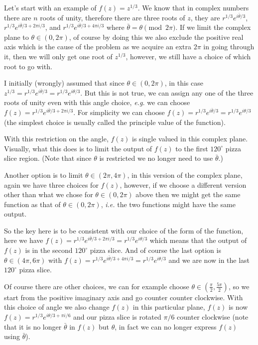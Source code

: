 \documentclass[aps,preprint,preprintnumbers,nofootinbib,showpacs,prd]{revtex4-1}
\newcommand{\ie}{{\it i.e.} }
\newcommand{\eg}{{\it e.g.} }
\begin{document}
Let's start with an example of $f(z) = z^{1/3}$. We know that in complex numbers there are $n$ roots of unity, therefore there are three roots of $z$, they are $r^{1/3} e^{i\bar\theta/3}$, $r^{1/3} e^{i\bar\theta/3 + 2\pi i/3}$, and $r^{1/3} e^{i\bar\theta/3 + 4\pi i/3}$ where $\bar\theta = \theta \pmod{2\pi}$. If we limit the complex plane to $\theta \in (0,2\pi)$, of course by doing this we also exclude the positive real axis which is the cause of the problem as we acquire an extra $2\pi$ in going through it, then we will only get one root of $z^{1/3}$, however, we still have a choice of which root to go with.

I initially (wrongly) assumed that since $\theta \in (0,2\pi)$, in this case $z^{1/3} = r^{1/3} e^{i\bar\theta/3} = r^{1/3} e^{i\theta/3}$. But this is not true, we can assign any one of the three roots of unity even with this angle choice, \eg we can choose $f(z) = r^{1/3} e^{i\bar\theta/3 + 2\pi i/3}$. For simplicity we can choose $f(z) = r^{1/3} e^{i\bar\theta/3} = r^{1/3} e^{i\theta/3}$ (the simplest choice is usually called the principle value of the function).

With this restriction on the angle, $f(z)$ is single valued in this complex plane. Visually, what this does is to limit the output of $f(z)$ to the first $120^\circ$ pizza slice region. (Note that since $\theta$ is restricted we no longer need to use $\bar\theta$.)

Another option is to limit $\theta \in (2\pi, 4\pi)$, in this version of the complex plane, again we have three choices for $f(z)$, however, if we choose a different version other than what we chose for $\theta \in (0,2\pi)$ above then we might get the same function as that of $\theta \in (0,2\pi)$, \ie the two functions might have the same output.

So the key here is to be consistent with our choice of the form of the function, here we have $f(z) = r^{1/3} e^{i\bar\theta/3 + 2\pi i/3} = r^{1/3} e^{i\theta/3}$ which means that the output of $f(z)$ is in the second $120^\circ$ pizza slice. And of course the last option is $\theta \in (4\pi, 6\pi)$ with $f(z) = r^{1/3} e^{i\bar\theta/3 + 4 \pi i/3}= r^{1/3} e^{i\theta/3}$ and we are now in the last $120^\circ$ pizza slice.

Of course there are other choices, we can for example choose $\theta \in (\tfrac{\pi}{2}, \tfrac{5\pi}{2})$, so we start from the positive imaginary axis and go counter counter clockwise. With this choice of angle we also change $f(z)$ in this particular plane, $f(z)$ is now $f(z) = r^{1/3} e^{i\theta/3 + \pi i/6}$ and our pizza slice is rotated $\pi/6$ counter clockwise (note that it is no longer $\bar\theta$ in $f(z)$ but $\theta$, in fact we can no longer express $f(z)$ using $\bar\theta$).
\end{document}
